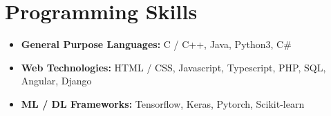 \documentclass[letterpaper,8pt]{article}
\newcommand{\resumeSubHeadingListStart}{\begin{itemize}[leftmargin=*]}
\newcommand{\resumeSubHeadingListEnd}{\end{itemize}}
\begin{document}
\section{Programming Skills}
  \resumeSubHeadingListStart
    \item{
      \textbf{General Purpose Languages}{\textbf{:} C / C++, Java, Python3, C\#}
      \hfill
    }
    \vspace{-4pt}
    \item{
      \textbf{Web Technologies}{\textbf{:} HTML / CSS, Javascript, Typescript, PHP, SQL, Angular, Django}
      \hfill
    }
    \vspace{-4pt}
    \item{
      \textbf{ML / DL Frameworks}{\textbf{:} Tensorflow, Keras, Pytorch, Scikit-learn}
      \hfill
    }
  \resumeSubHeadingListEnd
\end{document}
